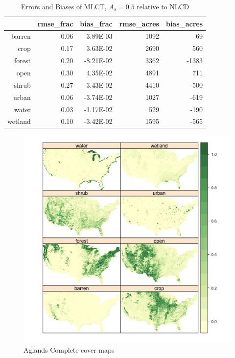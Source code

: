 \begin{table}[ht]
\begin{center}
\begin{tabular}{rrrrr}
  \hline
 & rmse\_frac & bias\_frac & rmse\_acres & bias\_acres \\ 
  \hline
barren & 0.06 & 3.89E-03 & 1092 & 69 \\ 
  crop & 0.17 & 3.63E-02 & 2690 & 560 \\ 
  forest & 0.20 & -8.21E-02 & 3362 & -1383 \\ 
  open & 0.30 & 4.35E-02 & 4891 & 711 \\ 
  shrub & 0.27 & -3.43E-02 & 4410 & -500 \\ 
  urban & 0.06 & -3.74E-02 & 1027 & -619 \\ 
  water & 0.03 & -1.17E-02 & 529 & -190 \\ 
  wetland & 0.10 & -3.42E-02 & 1595 & -565 \\ 
   \hline
\end{tabular}
\caption{Errors and Biases of MLCT, $A_s = 0.5$ relative to NLCD}
\label{tab:ebmlct05}
\end{center}
\end{table}

\begin{figure} 
\begin{center} 
\includegraphics{fig_agc}
\end{center} 
\caption{Aglands Complete cover maps} 
\label{fig:agc} 
\end{figure} 

